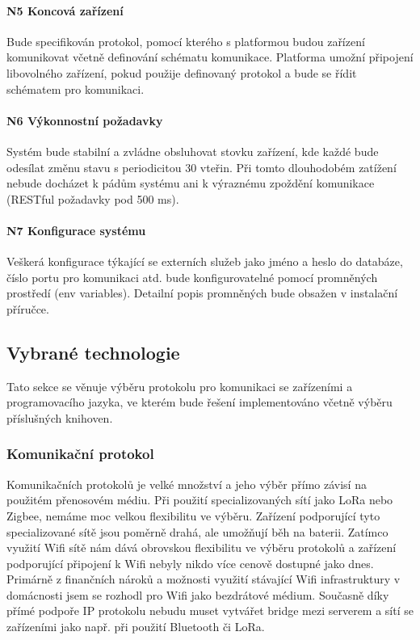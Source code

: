 \paragraph{N5 Koncová zařízení}
Bude specifikován protokol, pomocí kterého s platformou budou zařízení komunikovat včetně definování schématu komunikace. Platforma umožní připojení libovolného zařízení, pokud použije definovaný protokol a bude se řídit schématem pro komunikaci.

\paragraph{N6 Výkonnostní požadavky}
Systém bude stabilní a zvládne obsluhovat stovku zařízení, kde každé bude odesílat změnu stavu s periodicitou 30 vteřin. Při tomto dlouhodobém zatížení nebude docházet k pádům systému ani k výraznému zpoždění komunikace (RESTful požadavky pod 500 ms).

\paragraph{N7 Konfigurace systému}
Veškerá konfigurace týkající se externích služeb jako jméno a heslo do databáze, číslo portu pro komunikaci atd. bude konfigurovatelné pomocí promněných prostředí (env variables). Detailní popis promněných bude obsažen v instalační příručce.


\subsection{Vybrané technologie}
Tato sekce se věnuje výběru protokolu pro komunikaci se zařízeními a programovacího jazyka, ve kterém bude řešení implementováno včetně výběru příslušných knihoven.

\subsubsection{Komunikační protokol}
Komunikačních protokolů je velké množství a jeho výběr přímo závisí na použitém přenosovém médiu. Při použití specializovaných sítí jako LoRa nebo Zigbee, nemáme moc velkou flexibilitu ve výběru. Zařízení podporující tyto specializované sítě jsou poměrně drahá, ale umožňují běh na baterii. Zatímco využití Wifi sítě nám dává obrovskou flexibilitu ve výběru protokolů a zařízení podporující připojení k Wifi nebyly nikdo více cenově dostupné jako dnes. Primárně z finančních nároků a možnosti využití stávající Wifi infrastruktury v domácnosti jsem se rozhodl pro Wifi jako bezdrátové médium. Současně díky přímé podpoře IP protokolu nebudu muset vytvářet bridge mezi serverem a sítí se zařízeními jako např. při použití Bluetooth či LoRa.

